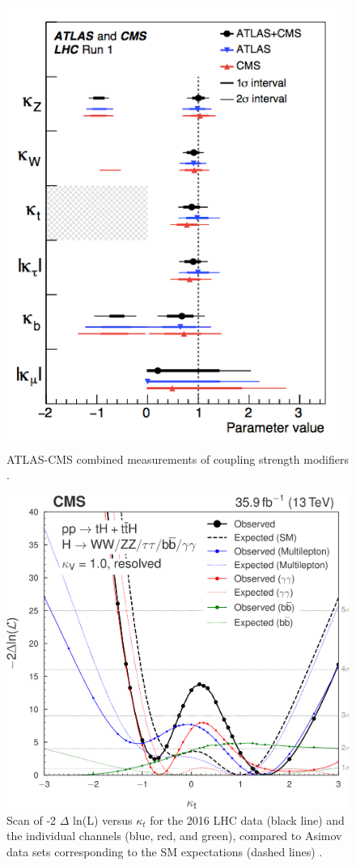 \documentclass[final,3p]{CSP}
\begin{document}
\newpage
  \begin{figure}[H]
    \centering
    \includegraphics[scale=0.4]{./couplings.png}
    \caption{ATLAS-CMS combined measurements of coupling strength modifiers \cite{Tanabashi:2018oca}.}
    \label{figureKappas}
  \end{figure}
  
  \begin{figure}[H]
    \centering
    \includegraphics[width=0.4 \columnwidth]{./cms13.png}
    \caption{Scan of -2 $\Delta$ ln(L) versus $\kappa_t$ for the 2016 LHC data (black line) and the individual channels (blue, red, and green), compared to Asimov data sets corresponding to the SM expectations (dashed lines) \cite{sirunyan2019search}.}
    \label{figureKt}
  \end{figure}
  
\end{document}
